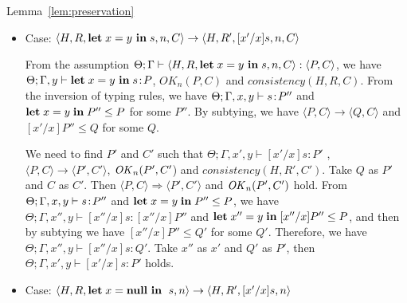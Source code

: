 \begin{pfof}{Lemma~\ref{lem:preservation}}
\begin{itemize}
  From the assumption \( \Theta; \Gamma \vdash \langle H, R, *x
  \leftarrow y, n, C \rangle : \langle P, C \rangle\), we have
  \(\Theta; \Gamma \vdash *x \leftarrow y : P\), \(\OK_{n}(P, C)\) and
  \(consistency(H, R, C)\). From the inversion of typing rules, we
  have \(0 \le P\).

  We need to find \(P'\) and \(C'\) such that \(\Theta; \Gamma
  \vdash \SKIP: P'\), \( \langle P, C \rangle \Longrightarrow \langle
  P', C' \rangle \) and \(\OK_n(P', C')\). Take \(P\) as \(P'\) and
  \(C\) as \(C'\). Then \( \langle P, C\rangle \Longrightarrow \langle
  P', C'\rangle\) holds, and then \(\OK_n(P', C')\) and
  \(consistency(H', R, C')\) hold from Lemma~\ref{lem:okPreserved} and
  Lemma~\ref{lem:consistency}. We also have \(\Theta; \Gamma
  \vdash \SKIP: P'\) from , \(0 \le P\) and .

\item Case: \( \langle H, R, \mathbf{let}\; x = y\ \mathbf{in}\; s , n, C \rangle
  \rightarrow \langle H, R', [x'/x]s, n, C \rangle \)

  From the assumption \( \Theta; \Gamma \vdash \langle H, R, \mathbf{let}\; x =
  y\ \mathbf{in}\; s, n, C \rangle : \langle P, C \rangle\), we have \(\Theta;
  \Gamma, y \vdash \mathbf{let}\; x = y \ \mathbf{in}\; s \!:\! P\), \(OK_{n}(P, C)\) and
  \(consistency(H, R, C)\). From the inversion of typing rules, we
  have \(\Theta; \Gamma, x,y \vdash s\!:\! P''\) and \( \mathbf{let}\; x = y\;
  \mathbf{in}\; P'' \le P\) for some \(P''\). By subtying, we have \( \langle P,
  C \rangle \rightarrow \langle Q, C \rangle \) and \([x'/x]P'' \le
  Q\) for some \(Q\).

  We need to find \(P'\) and \(C'\) such that \(\Theta; \Gamma,x',y
  \vdash [x'/x]s : P'\) , \( \langle P, C \rangle \rightarrow \langle
  P', C' \rangle\), \(\mathit{OK}_n(P', C'\)) and \(consistency(H, R',
  C')\). Take \(Q\) as \(P'\) and \(C\) as \(C'\). Then \( \langle P,C
  \rangle \Longrightarrow \langle P', C' \rangle\) and \(\OK_n(P',
  C')\) hold. From \(\Theta; \Gamma, x,y \vdash s\!:\! P''\) and \(
  \mathbf{let}\; x = y\; \mathbf{in}\; P'' \le P\), we have \(\Theta; \Gamma, x'',y \vdash
       [x''/x]s : [x''/x]P''\) and \( \mathbf{let}\; x'' = y\; \mathbf{in}\; [x''/x]P''
       \le P\), and then by subtying we have \([x''/x]P'' \le Q'\) for
       some \(Q'\). Therefore, we have \(\Theta; \Gamma, x'',y \vdash
       [x''/x]s : Q'\). Take \(x''\) as \(x'\) and \(Q'\) as \(P'\),
       then \(\Theta; \Gamma,x',y \vdash [x'/x]s : P'\) holds.
  
\item Case: \( \langle H, R, \LET x = \NULL \ \IN \ s, n\rangle
  \rightarrow \langle H, R', [x'/x]s, n \rangle \)


\end{itemize}
\end{pfof}
